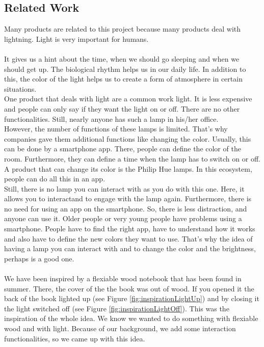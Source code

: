 \documentclass[04_projectProcess.tex]{subfiles}
\begin{document}
    \subsection{Related Work}
        \begin{flushleft}
            Many products are related to this project because many products deal with lightning.
            Light is very important for humans.\\~\\
            It gives us a hint about the time, when we should go sleeping and when we should get 
            up. The biological rhythm helps us in our daily life. In addition to this, the color 
            of the light helps us to create a form of atmosphere in certain situations.\\
            
            One product that deals with light are a common work light. It is less expensive and 
            people can only say if they want the light on or off. There are no other 
            functionalities. Still, nearly anyone has such a lamp in his/her office. \\

            However, the number of functions of these lamps is limited. That's why companies 
            gave them additional functions like changing the color. Usually, this can be done 
            by a smartphone app. There, people can define the color of the room. Furthermore, 
            they can define a time when the lamp has to switch on or off. A product that can 
            change its color is the Philip Hue lamps. In this ecosystem, people can do all this 
            in an app.  \\ 

            Still, there is no lamp you can interact with as you do with this one. Here, it 
            allows you to interactand to engage with the lamp again. Furthermore, there is no 
            need for using an app on the smartphone. So, there is less distraction, and anyone 
            can use it. Older people or very young people have problems using a smartphone. 
            People have to find the right app, have to understand how it works and also have to 
            define the new colors they want to use. That's why the idea of having a lamp you can 
            interact with and to change the color and the brightness, perhaps is a good one. \\~\\

            We have been inspired by a flexiable wood notebook that has been found in summer. 
            There, the cover of the the book was out of wood. If you opened it the back of the
            book lighted up (see Figure \ref{fig:inspirationLightUp}) and by closing it the 
            light switched off (see Figure \ref{fig:inspirationLightOff}). This was the 
            inspiration of the whole idea. We know we wanted to do something with flexiable 
            wood and with light. Because of our background, we add some interaction functionalities,
            so we came up with this idea.


\end{flushleft}
\end{document}
